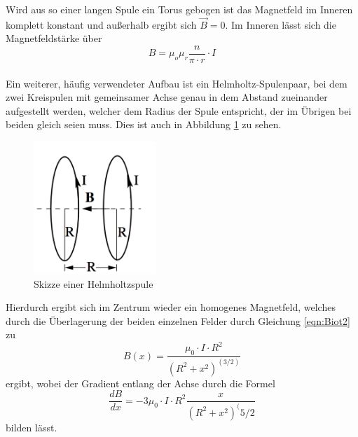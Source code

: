 \noindent Wird aus so einer langen Spule ein Torus gebogen ist das Magnetfeld im
Inneren komplett konstant und außerhalb ergibt sich $ \vec{B} = 0$. Im Inneren
lässt sich die Magnetfeldstärke über
\begin{equation}
    B= \mu_o \mu_r \frac{n}{\pi \cdot r} \cdot I
    \label{eqn:torus}
  \end{equation} \\

  \noindent Ein weiterer, häufig verwendeter Aufbau ist ein Helmholtz-Spulenpaar,
  bei dem zwei Kreispulen mit gemeinsamer Achse genau in dem Abstand zueinander
  aufgestellt werden, welcher dem Radius der Spule entspricht, der im Übrigen
  bei beiden gleich seien muss. Dies ist auch in Abbildung \ref{fig:helm} zu sehen.
  \begin{figure}[H]
    \centering
    \includegraphics[height=5cm]{Helmholtz.png}
    \caption{Skizze einer Helmholtzspule \cite{skript}}
    \label{fig:helm}
  \end{figure}

  \noindent Hierdurch ergibt sich im Zentrum wieder ein homogenes
  Magnetfeld, welches durch die Überlagerung der beiden einzelnen Felder durch Gleichung
  \ref{eqn:Biot2} zu
  \begin{equation}
    B(x)= \frac{\mu_0 \cdot I \cdot R^2}{(R^2 + x^2)^(3/2)}
    \label{eqn:Helmholtz}
  \end{equation}
  ergibt, wobei der Gradient entlang der Achse durch die Formel
  \begin{equation}
    \frac{dB}{dx} = -3\mu_0 \cdot I \cdot R^2 \frac{x}{(R^2+x^2)^(5/2}
    \label{eqn:gradient}
  \end{equation}
bilden lässt. \\

